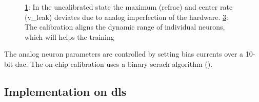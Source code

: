 \begin{figure}
	\begin{subfigure}[b]{0.47\textwidth}
		\begin{center}
			
		\end{center}
		\label{transferfunction_wout_calib}
	\end{subfigure}
	\begin{subfigure}[b]{0.47\textwidth}		
		\begin{center}
			
		\end{center}
		\label{transferfunction_w_calib}
	\end{subfigure}
	\caption{\cref{transferfunction_wout_calib}: In the uncalibrated state the maximum (\gls{refrac}) and center rate (\gls{v_leak}) deviates due to analog imperfection of the hardware. \cref{transferfunction_w_calib}: The calibration aligns the dynamic range of individual neurons, which will helps the training}
\end{figure}

The analog neuron parameters are controlled by setting bias currents over a 10-bit \gls{dac}. The on-chip calibration uses a binary serach algorithm (\cite{binarysearchsource}). 

%
%




\subsection{Implementation on \gls{dls}}


